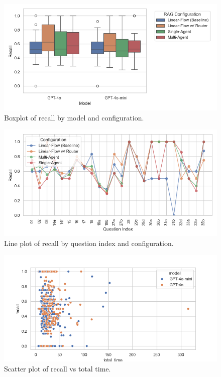                 \begin{figure}[H]
                    \centering
                    \includegraphics[width=0.75\linewidth]{images_exp2/recall/recall_boxplot_by_model_and_configuration.png}
                    \caption{Boxplot of recall by model and configuration.}
                    \label{fig:recall_boxplot_by_model_and_configuration}
                \end{figure}



                \begin{figure}[H]
                    \centering
                    \includegraphics[width=0.75\linewidth]{images_exp2/recall/recall_lineplot_by_question_index_and_configuration.png}
                    \caption{Line plot of recall by question index and configuration.}
                    \label{fig:recall_lineplot_by_question_index_and_configuration}
                \end{figure}

                \begin{figure}[H]
                    \centering
                    \includegraphics[scale=0.75]{images_exp2/recall/scatter_recall_vs_total_time.png}
                    \caption{Scatter plot of recall vs total time.}
                    \label{fig:scatter_recall_vs_total_time}
                \end{figure} 

